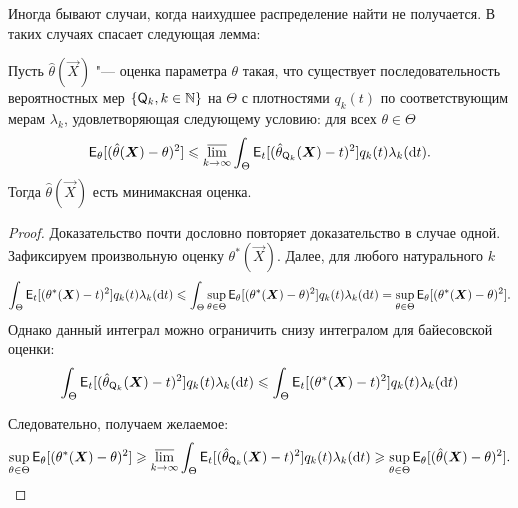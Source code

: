 Иногда бывают случаи, когда наихудшее распределение найти не получается. В таких случаях спасает следующая лемма:
\begin{lemma}
    Пусть $\hat{\theta}(\vec{X})$ "--- оценка параметра $\theta$ такая, что существует последовательность вероятностных мер $\{\mathsf{Q}_{k}, k \in \mathbb{N}\}$ на $\Theta$ с плотностями $q_{k}(t)$ по соответствующим мерам $\lambda_{k}$, удовлетворяющая следующему условию: для всех $\theta \in \Theta$
    \[
        \operatorname{\mathsf{E}}_{\theta}[(\hat{\theta}(\bm{X}) - \theta)^{2}] \leqslant \varlimsup_{k \to \infty} \int_{\Theta} \operatorname{\mathsf{E}}_{t}[(\hat{\theta}_{\mathsf{Q}_{k}}(\bm{X}) - t)^{2}]q_{k}(t)\lambda_{k}(\dd t).
    \]
    Тогда $\hat{\theta}(\vec{X})$ есть минимаксная оценка.
\end{lemma}
\begin{proof}
    Доказательство почти дословно повторяет доказательство в случае одной. Зафиксируем произвольную оценку $\theta^{*}(\vec{X})$. Далее, для любого натурального $k$
    \[
        \int_{\Theta} \operatorname{\mathsf{E}}_{t}[(\theta^{*}(\bm{X}) - t)^{2}]q_{k}(t)\lambda_{k}(\dd t) \leqslant  \int_{\Theta} \sup_{\theta \in \Theta} \operatorname{\mathsf{E}}_{\theta}[(\theta^{*}(\bm{X}) - \theta)^{2}]q_{k}(t)\lambda_{k}(\dd t) = \sup_{\theta \in \Theta} \operatorname{\mathsf{E}}_{\theta}[(\theta^{*}(\bm{X}) - \theta)^{2}].
    \]
    Однако данный интеграл можно ограничить снизу интегралом для байесовской оценки:
    \[
        \int_{\Theta} \operatorname{\mathsf{E}}_{t}[(\hat{\theta}_{\mathsf{Q}_{k}}(\bm{X}) - t)^{2}]q_{k}(t)\lambda_{k}(\dd t) \leqslant \int_{\Theta} \operatorname{\mathsf{E}}_{t}[(\theta^{*}(\bm{X}) - t)^{2}]q_{k}(t)\lambda_{k}(\dd t)
    \]
    
    Следовательно, получаем желаемое:
    \[
        \sup_{\theta \in \Theta} \operatorname{\mathsf{E}}_{\theta}[(\theta^{*}(\bm{X}) - \theta)^{2}]
        \geqslant \varlimsup_{k \to \infty} \int_{\Theta} \operatorname{\mathsf{E}}_{t}[(\hat{\theta}_{\mathsf{Q}_{k}}(\bm{X}) - t)^{2}]q_{k}(t)\lambda_{k}(\dd t)
        \geqslant \sup_{\theta \in \Theta} \operatorname{\mathsf{E}}_{\theta}[(\hat{\theta}(\bm{X}) - \theta)^{2}]. \qedhere
    \]
\end{proof}


